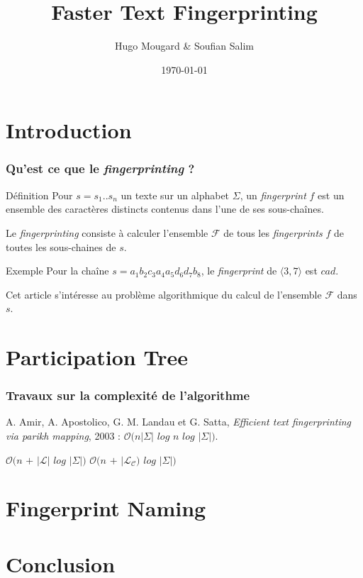 \documentclass[10pt]{beamer}
\title{Faster Text Fingerprinting}
\author{Hugo Mougard \& Soufian Salim}
\date{\today}
\begin{document}
\begin{frame}
  \maketitle
\end{frame}

\begin{frame}
	\tableofcontents
\end{frame}

\section{Introduction}

\begin{frame}
	\frametitle{Qu'est ce que le \textit{fingerprinting} ?}
	
	\begin{block}{Définition}
		Pour $s = s_{1} .. s_{n}$ un texte sur un alphabet $\Sigma$, un \textit{fingerprint} $f$ est un ensemble des caractères distincts contenus dans l'une de ses sous-chaînes. \newline
	
	Le \textit{fingerprinting} consiste à calculer l'ensemble $\mathcal{F}$ de tous les \textit{fingerprints} $f$ de toutes les sous-chaines de $s$. 
	\end{block}
	
	\begin{block}{Exemple}
		Pour la chaîne $s = a_{1} b_{2} c_{3} a_{4} a_{5} d_{6} d_{7} b_{8}$, le \textit{fingerprint} de $\langle 3,7 \rangle$ est $cad$.
	\end{block}
	
	Cet article s'intéresse au problème algorithmique du calcul de l'ensemble $\mathcal{F}$ dans $s$.	
\end{frame}

\section{Participation Tree}

\begin{frame}
	\frametitle{Travaux sur la complexité de l'algorithme}
	
	A. Amir, A. Apostolico, G. M. Landau et G. Satta, \textit{Efficient text fingerprinting via parikh mapping}, 2003 : 
	$\mathcal{O}(n|\Sigma|$ $log$ $n$ $log$ $|\Sigma|)$. \newline
	
	$\mathcal{O}(n$ $+$ $|\mathcal{L}|$ $log$ $|\Sigma|)$
	$\mathcal{O}(n$ $+$ $|\mathcal{L}_{\mathcal{C}})$ $log$ $|\Sigma|)$

\end{frame}

\section{Fingerprint Naming}

\section{Conclusion}
\end{document}
